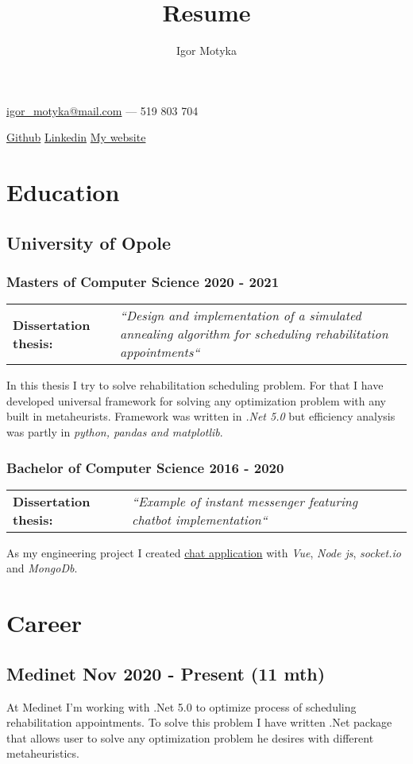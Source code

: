 \documentclass[10pt]{article}
\author{Igor Motyka}
\title{Resume}
\makeatletter
\renewcommand{\maketitle}{
 \begin{center}
    \huge\bfseries\theauthor
 \end{center}
 \begin{center}
    \href{mailto:igor\_motyka@mail.com}{igor\_motyka@mail.com} --- 519 803 704 \\
 \end{center}
 \begin{center}
	 \href{https://github.com/Anav0}{Github} \hspace{0.7cm} \href{https://www.linkedin.com/in/igor-m-873439168/}{Linkedin} \hspace{0.7cm} \href{https://igormotyka.netlify.app/}{My website}
 \end{center}
 }
\makeatother
\begin{document}
\maketitle

\section{Education}
\subsection{University of Opole}
\subsubsection{Masters of Computer Science 2020 - 2021}
\begin{table}[H]
    \begin{tabularx}{\textwidth}{@{}l X}
     \textbf{Dissertation thesis:} & \textit{``Design and implementation of a simulated annealing algorithm for scheduling rehabilitation appointments``} \\
    \end{tabularx}
\end{table}
\noindent In this thesis I try to solve rehabilitation scheduling problem. For that I have developed universal framework for solving any optimization problem with any built in metaheurists. Framework was written in \emph{.Net 5.0} but efficiency analysis was partly in \emph{python, pandas and matplotlib}.
\subsubsection{Bachelor of Computer Science 2016 - 2020}
\begin{table}[H]
    \begin{tabularx}{\textwidth}{@{}l X}
    \textbf{Dissertation thesis:} &  \textit{``Example of instant messenger featuring chatbot implementation``}\\
    \end{tabularx}
\end{table}
\noindent As my engineering project I created \href{https://www.behance.net/gallery/91600605/Gymba-chat}{chat application} with \emph{Vue}, \emph{Node js}, \emph{socket.io} and \emph{MongoDb}.
\section{Career}
\subsection{Medinet Nov 2020 - Present (11 mth)}
At Medinet I'm working with .Net 5.0 to optimize process of scheduling rehabilitation appointments. To solve this problem I have written .Net package that allows user to solve any optimization problem he desires with different metaheuristics.
\end{document}
